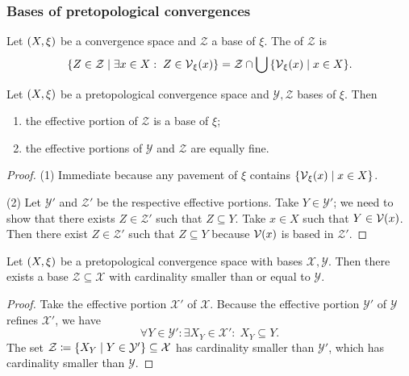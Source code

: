 \subsubsection{Bases of pretopological convergences}
\begin{definition}
Let $\left( X,\xi \right)$ be a convergence space and $\mathcal{Z}$ a base of $\xi$. The  of $\mathcal{Z}$ is
\[ \setbuilder{Z\in \mathcal{Z}}{\exists x\in X: \; Z\in \vicinity_\xi(x)} = \mathcal{Z}\cap \bigcup\setbuilder{\vicinity_\xi(x)}{x\in X}. \]
\end{definition}

\begin{lemma}
Let $\left( X,\xi \right)$ be a pretopological convergence space and $\mathcal{Y}, \mathcal{Z}$ bases of $\xi$. Then
\begin{enumerate}
\item the effective portion of $\mathcal{Z}$ is a base of $\xi$;
\item the effective portions of $\mathcal{Y}$ and $\mathcal{Z}$ are equally fine.
\end{enumerate}
\end{lemma}
\begin{proof}
(1) Immediate because any pavement of $\xi$ contains $\setbuilder{\vicinity_\xi(x)}{x\in X}$.

(2) Let $\mathcal{Y}'$ and $\mathcal{Z}'$ be the respective effective portions. Take $Y\in \mathcal{Y}'$; we need to show that there exists $Z\in \mathcal{Z}'$ such that $Z\subseteq Y$. Take $x\in X$ such that $Y\in \operatorname{\mathcal{V}}(x)$. Then there exist $Z \in \mathcal{Z}'$ such that $Z\subseteq Y$ because $\operatorname{\mathcal{V}}(x)$ is based in $\mathcal{Z}'$. 
\end{proof}
\begin{corollary} \label{cardinalityPretopologicalBase}
Let $\left( X,\xi \right)$ be a pretopological convergence space with bases $\mathcal{X},\mathcal{Y}$. Then there exists a base $\mathcal{Z} \subseteq \mathcal{X}$ with cardinality smaller than or equal to $\mathcal{Y}$.
\end{corollary}
\begin{proof}
Take the effective portion $\mathcal{X}'$ of $\mathcal{X}$. Because the effective portion $\mathcal{Y}'$ of $\mathcal{Y}$ refines $\mathcal{X}'$, we have
\[ \forall Y\in \mathcal{Y}': \exists X_Y \in \mathcal{X}': \; X_Y\subseteq Y. \]
The set $\mathcal{Z} \defeq \setbuilder{X_Y}{Y\in \mathcal{Y}'} \subseteq \mathcal{X}$ has cardinality smaller than $\mathcal{Y}'$, which has cardinality smaller than $\mathcal{Y}$.
\end{proof}

